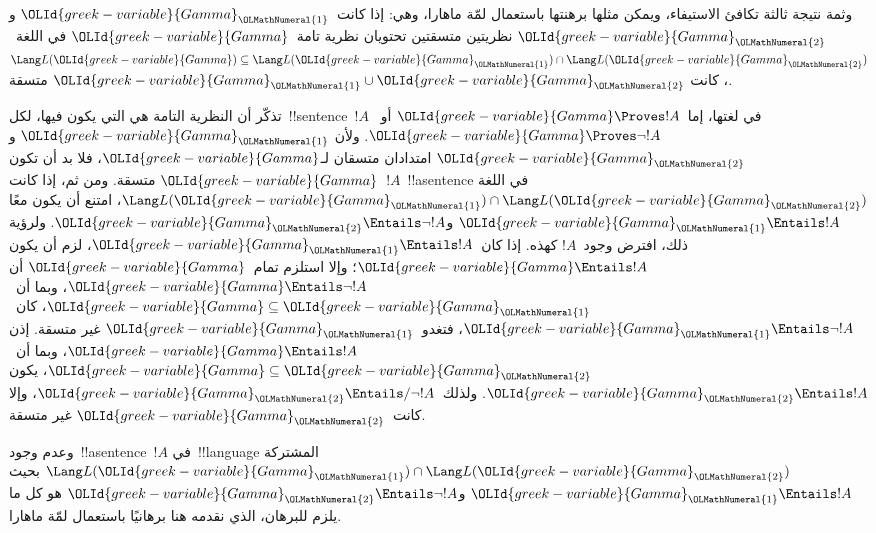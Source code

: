 \documentclass[../../../include/open-logic-section]{subfiles}
\begin{document}
وثمة نتيجة ثالثة تكافئ الاستيفاء، ويمكن مثلها برهنتها باستعمال لمّة
ماهارا، وهي: إذا كانت~${\OLId{greek-variable}{Gamma}}_{\OLMathNumeral{1}}$ و${\OLId{greek-variable}{Gamma}}_{\OLMathNumeral{2}}$ نظريتين متسقتين تحتويان
نظرية تامة~${\OLId{greek-variable}{Gamma}}$ في اللغة~$\Lang L({\OLId{greek-variable}{Gamma}}) \subseteq
\Lang L({\OLId{greek-variable}{Gamma}}_{\OLMathNumeral{1}}) \cap \Lang L({\OLId{greek-variable}{Gamma}}_{\OLMathNumeral{2}})$، كانت
${\OLId{greek-variable}{Gamma}}_{\OLMathNumeral{1}} \cup {\OLId{greek-variable}{Gamma}}_{\OLMathNumeral{2}}$ متسقة.

تذكّر أن النظرية التامة هي التي يكون فيها، لكل~!!{sentence}~$!A$ في
لغتها، إما~${\OLId{greek-variable}{Gamma}} \Proves !A$ أو~${\OLId{greek-variable}{Gamma}} \Proves \lnot !A$. ولأن
${\OLId{greek-variable}{Gamma}}_{\OLMathNumeral{1}}$ و${\OLId{greek-variable}{Gamma}}_{\OLMathNumeral{2}}$ امتدادان متسقان لـ${\OLId{greek-variable}{Gamma}}$، فلا بد أن تكون
${\OLId{greek-variable}{Gamma}}$ متسقة. ومن ثم، إذا كانت~$!A$~!!a{sentence} في اللغة
$\Lang L({\OLId{greek-variable}{Gamma}}_{\OLMathNumeral{1}}) \cap \Lang L({\OLId{greek-variable}{Gamma}}_{\OLMathNumeral{2}})$، امتنع أن يكون معًا
${\OLId{greek-variable}{Gamma}}_{\OLMathNumeral{1}} \Entails !A$ و${\OLId{greek-variable}{Gamma}}_{\OLMathNumeral{2}} \Entails \lnot !A$. ولرؤية ذلك،
افترض وجود~$!A$ كهذه. إذا كان~${\OLId{greek-variable}{Gamma}}_{\OLMathNumeral{1}} \Entails !A$، لزم أن يكون
${\OLId{greek-variable}{Gamma}} \Entails !A$؛ وإلا استلزم تمام~${\OLId{greek-variable}{Gamma}}$ أن
${\OLId{greek-variable}{Gamma}} \Entails \lnot !A$، وبما أن~${\OLId{greek-variable}{Gamma}} \subseteq {\OLId{greek-variable}{Gamma}}_{\OLMathNumeral{1}}$،
كان~${\OLId{greek-variable}{Gamma}}_{\OLMathNumeral{1}} \Entails \lnot !A$، فتغدو~${\OLId{greek-variable}{Gamma}}_{\OLMathNumeral{1}}$ غير متسقة. إذن
${\OLId{greek-variable}{Gamma}} \Entails !A$، وبما أن~${\OLId{greek-variable}{Gamma}} \subseteq {\OLId{greek-variable}{Gamma}}_{\OLMathNumeral{2}}$، يكون
${\OLId{greek-variable}{Gamma}}_{\OLMathNumeral{2}} \Entails !A$. ولذلك~${\OLId{greek-variable}{Gamma}}_{\OLMathNumeral{2}} \Entails/ \lnot !A$، وإلا
كانت~${\OLId{greek-variable}{Gamma}}_{\OLMathNumeral{2}}$ غير متسقة.

وعدم وجود~!!a{sentence}~$!A$ في~!!{language} المشتركة
$\Lang L({\OLId{greek-variable}{Gamma}}_{\OLMathNumeral{1}}) \cap \Lang L({\OLId{greek-variable}{Gamma}}_{\OLMathNumeral{2}})$ بحيث
${\OLId{greek-variable}{Gamma}}_{\OLMathNumeral{1}} \Entails !A$ و${\OLId{greek-variable}{Gamma}}_{\OLMathNumeral{2}} \Entails \lnot !A$ هو كل ما يلزم
للبرهان، الذي نقدمه هنا برهانيًا باستعمال لمّة ماهارا.
\end{document}
